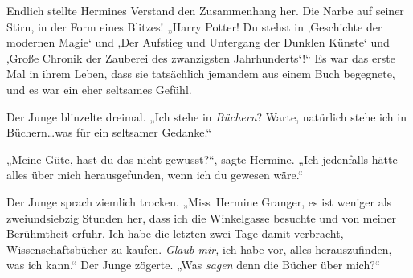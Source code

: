 Endlich stellte Hermines Verstand den Zusammenhang her. Die Narbe auf seiner Stirn, in der Form eines Blitzes! „Harry Potter! Du stehst in ‚Geschichte der modernen Magie‘ und ‚Der Aufstieg und Untergang der Dunklen Künste‘ und ‚Große Chronik der Zauberei des zwanzigsten Jahrhunderts‘!“ Es war das erste Mal in ihrem Leben, dass sie tatsächlich jemandem aus einem Buch begegnete, und es war ein eher seltsames Gefühl.

Der Junge blinzelte dreimal. „Ich stehe in \emph{Büchern}? Warte, natürlich stehe ich in Büchern…was für ein seltsamer Gedanke.“

„Meine Güte, hast du das nicht gewusst?“, sagte Hermine. „Ich jedenfalls hätte alles über mich herausgefunden, wenn ich du gewesen wäre.“

Der Junge sprach ziemlich trocken. „Miss~Hermine Granger, es ist weniger als zweiundsiebzig Stunden her, dass ich die Winkelgasse besuchte und von meiner Berühmtheit erfuhr. Ich habe die letzten zwei Tage damit verbracht, Wissenschaftsbücher zu kaufen. \emph{Glaub mir,} ich habe vor, alles herauszufinden, was ich kann.“ Der Junge zögerte. „Was \emph{sagen} denn die Bücher über mich?“

